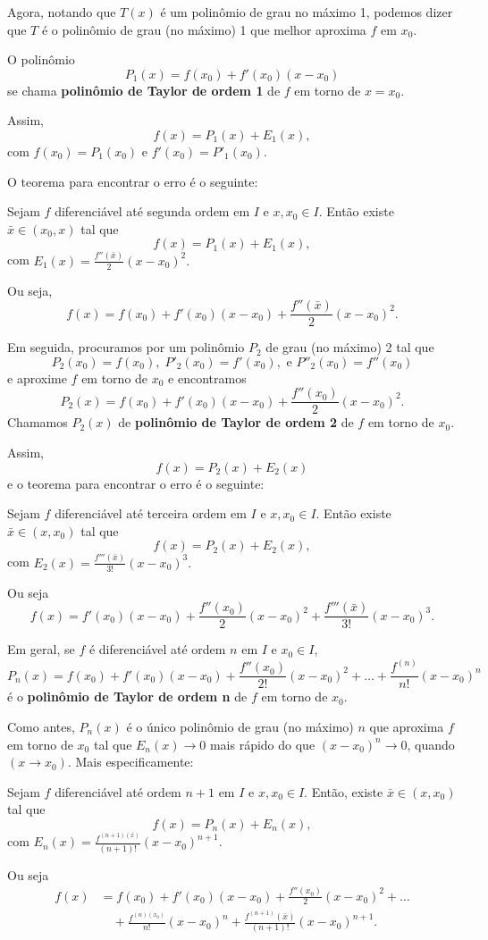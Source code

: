 Agora, notando que \(T(x)\) é um polinômio de grau no máximo 1, podemos dizer que \(T\) é o polinômio de grau (no máximo) 1 que melhor aproxima \(f\) em \(x_0\).

O polinômio \[P_1(x) = f(x_0) + f'(x_0)(x-x_0)\] se chama \textbf{polinômio de Taylor de ordem 1} de \(f\) em torno de \(x = x_0\).

Assim,\[f(x) = P_1(x) + E_1(x),\] com \(f(x_0) = P_1(x_0)\) e \(f'(x_0) = P'_1(x_0)\).

O teorema para encontrar o erro é o seguinte:
\begin{theorem}
    Sejam \(f\) diferenciável até segunda ordem em \(I\) e \(x, x_0\in I\). Então existe \(\bar{x}\in(x_0,x)\) tal que \[f(x) = P_1(x) + E_1(x),\] com \(E_1(x) = \frac{f''(\bar{x})}{2}(x-x_0)^2.\)

    Ou seja, \[f(x) = f(x_0) + f'(x_0)(x-x_0) + \frac{f''(\bar{x})}{2} (x-x_0)^2.\]
\end{theorem}

Em seguida, procuramos por um polinômio \(P_2\) de grau (no máximo) 2 tal que \[P_2(x_0) = f(x_0),\; P'_2(x_0) = f'(x_0),\text{ e } P''_2(x_0) = f''(x_0)\] e aproxime \(f\) em torno de \(x_0\) e encontramos \[P_2(x) = f(x_0) + f'(x_0)(x-x_0) + \frac{f''(x_0)}{2}(x-x_0)^2.\] Chamamos \(P_2(x)\) de \textbf{polinômio de Taylor de ordem 2} de \(f\) em torno de \(x_0\). 

Assim, \[f(x) = P_2(x) + E_2(x)\] e o teorema para encontrar o erro é o seguinte:
\begin{theorem}
    Sejam \(f\) diferenciável até terceira ordem em \(I\) e \(x,x_0\in I\). Então existe \(\bar{x}\in(x,x_0)\) tal que \[f(x) = P_2(x) + E_2(x),\] com \(E_2(x) = \frac{f'''(\bar{x})}{3!}(x-x_0)^3.\) 
    
    Ou seja \[f(x) = f'(x_0)(x-x_0) + \frac{f''(x_0)}{2}(x-x_0)^2 + \frac{f'''(\bar{x})}{3!}(x-x_0)^3.\]
\end{theorem}

Em geral, se \(f\) é diferenciável até ordem \(n\) em \(I\) e \(x_0\in I\), \[P_n(x) = f(x_0) + f'(x_0)(x-x_0) + \frac{f''(x_0)}{2!}(x-x_0)^2 + \dots + \frac{f^{(n)}}{n!}(x-x_0)^n\] é o \textbf{polinômio de Taylor de ordem n} de \(f\) em torno de \(x_0\).

Como antes, \(P_n(x)\) é o único polinômio de grau (no máximo) \(n\) que aproxima \(f\) em torno de \(x_0\) tal que \(E_n(x) \to 0\) mais rápido do que \((x-x_0)^n \to 0\), quando \((x\to x_0)\). Mais especificamente:
\begin{theorem}
    Sejam \(f\) diferenciável até ordem \(n+1\) em \(I\) e \(x,x_0\in I\). Então, existe \(\bar{x}\in(x,x_0)\) tal que \[f(x) = P_n(x) + E_n(x),\] com \(E_n(x) = \frac{f^{(n+1)(\bar{x})}}{(n+1)!}(x-x_0)^{n+1}\). 
    
    Ou seja
        \begin{align*}
            f(x) 
                & = f(x_0) + f'(x_0)(x-x_0) + \frac{f''(x_0)}{2}(x-x_0)^2 + \dots \\
                    & \quad + \frac{f^{(n)(x_0)}}{n!}(x-x_0)^n + \frac{f^{(n+1)}(\bar{x})}{(n+1)!}(x-x_0)^{n+1}.
        \end{align*}
\end{theorem}

